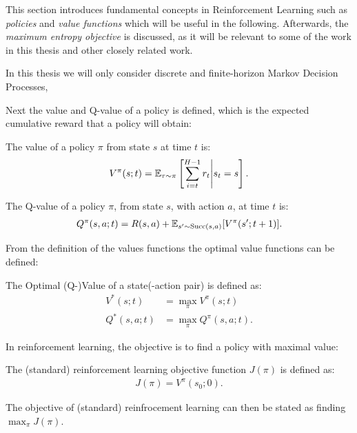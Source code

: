     
    
    This section introduces fundamental concepts in Reinforcement Learning such as \textit{policies} and \textit{value functions} which will be useful in the following. Afterwards, the \textit{maximum entropy objective} is discussed, as it will be relevant to some of the work in this thesis and other closely related work. 

    In this thesis we will only consider discrete and finite-horizon Markov Decision Processes, 

    Next the value and Q-value of a policy is defined, which is the expected cumulative reward that a policy will obtain:
    \begin{defn}
        \label{def:value}
        \label{def:q_value}
        The \textnormal{value} of a policy $\pi$ from state $s$ at time $t$ is:
        \begin{align}
            V^{\pi}(s;t) = \mathbb{E}_{\tau\sim\pi}\left[\sum_{i=t}^{H-1} r_t \Bigg| s_t=s \right].
        \end{align} 

        The \textnormal{Q-value} of a policy $\pi$, from state $s$, with action $a$, at time $t$ is:
        \begin{align}
            Q^{\pi}(s,a;t) = R(s,a) + \mathbb{E}_{s'\sim {\textnormal{Succ}(s,a)}} [V^{\pi}(s';t+1)].
        \end{align} 
    \end{defn}

    From the definition of the values functions the optimal value functions can be defined:
    \begin{defn}
        \label{def:optimal_value}
        \label{def:optimal_q_value}
        The \textnormal{Optimal (Q-)Value} of a state(-action pair) is defined as:
        \begin{align}
            V^*(s;t) &= \max_{\pi} V^{\pi}(s;t) \\
            Q^*(s,a;t) &= \max_{\pi} Q^{\pi}(s,a;t).
        \end{align}
    \end{defn}

    In reinforcement learning, the objective is to find a policy with maximal value:
    \begin{defn}
        The \textnormal{(standard) reinforcement learning objective function} $J(\pi)$ is defined as:
        \begin{align}
            J(\pi) = V^{\pi}(s_0;0).
        \end{align}

        The objective of (standard) reinfrocement learning can then be stated as finding $\max_{\pi} J(\pi)$.
    \end{defn}

